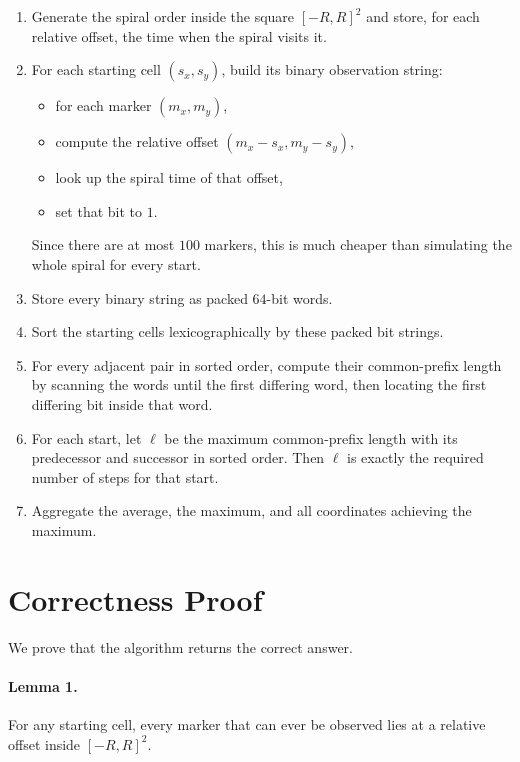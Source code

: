 \documentclass[11pt]{article}
\begin{document}
\begin{enumerate}[leftmargin=*]
    \item Generate the spiral order inside the square $[-R,R]^2$ and store, for each relative offset, the
    time when the spiral visits it.

    \item For each starting cell $(s_x, s_y)$, build its binary observation string:
    \begin{itemize}[leftmargin=*]
        \item for each marker $(m_x, m_y)$,
        \item compute the relative offset $(m_x-s_x, m_y-s_y)$,
        \item look up the spiral time of that offset,
        \item set that bit to $1$.
    \end{itemize}
    Since there are at most $100$ markers, this is much cheaper than simulating the whole spiral for every
    start.

    \item Store every binary string as packed $64$-bit words.

    \item Sort the starting cells lexicographically by these packed bit strings.

    \item For every adjacent pair in sorted order, compute their common-prefix length by scanning the
    words until the first differing word, then locating the first differing bit inside that word.

    \item For each start, let $\ell$ be the maximum common-prefix length with its predecessor and successor
    in sorted order. Then $\ell$ is exactly the required number of steps for that start.

    \item Aggregate the average, the maximum, and all coordinates achieving the maximum.
\end{enumerate}

\section*{Correctness Proof}

We prove that the algorithm returns the correct answer.

\paragraph{Lemma 1.}
For any starting cell, every marker that can ever be observed lies at a relative offset inside $[-R,R]^2$.
\end{document}
